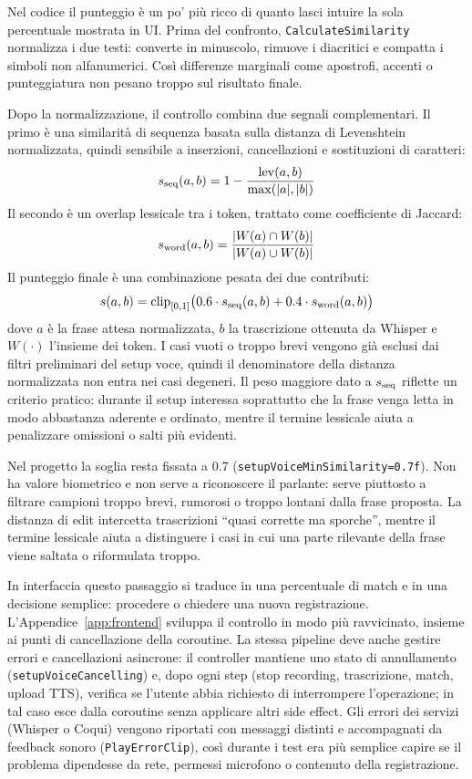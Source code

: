 Nel codice il punteggio è un po' più ricco di quanto lasci intuire la sola percentuale mostrata in UI. Prima del confronto, \texttt{CalculateSimilarity} normalizza i due testi: converte in minuscolo, rimuove i diacritici e compatta i simboli non alfanumerici. Così differenze marginali come apostrofi, accenti o punteggiatura non pesano troppo sul risultato finale.

Dopo la normalizzazione, il controllo combina due segnali complementari. Il primo è una similarità di sequenza basata sulla distanza di Levenshtein normalizzata, quindi sensibile a inserzioni, cancellazioni e sostituzioni di caratteri:
\[
s\sb{\mathrm{seq}}(a,b) = 1 - \frac{\mathrm{lev}(a,b)}{\max(|a|,|b|)}
\]
Il secondo è un overlap lessicale tra i token, trattato come coefficiente di Jaccard:
\[
s\sb{\mathrm{word}}(a,b) = \frac{|W(a)\cap W(b)|}{|W(a)\cup W(b)|}
\]
Il punteggio finale è una combinazione pesata dei due contributi:
\[
s(a,b) = \mathrm{clip}\sb{[0,1]}\big(0.6 \cdot s\sb{\mathrm{seq}}(a,b) + 0.4 \cdot s\sb{\mathrm{word}}(a,b)\big)
\]
dove \(a\) è la frase attesa normalizzata, \(b\) la trascrizione ottenuta da Whisper e \(W(\cdot)\) l'insieme dei token. I casi vuoti o troppo brevi vengono già esclusi dai filtri preliminari del setup voce, quindi il denominatore della distanza normalizzata non entra nei casi degeneri. Il peso maggiore dato a \(s\sb{\mathrm{seq}}\) riflette un criterio pratico: durante il setup interessa soprattutto che la frase venga letta in modo abbastanza aderente e ordinato, mentre il termine lessicale aiuta a penalizzare omissioni o salti più evidenti.\cite{Wang2020TextSim}

Nel progetto la soglia resta fissata a 0.7 (\texttt{setupVoiceMinSimilarity=0.7f}). Non ha valore biometrico e non serve a riconoscere il parlante: serve piuttosto a filtrare campioni troppo brevi, rumorosi o troppo lontani dalla frase proposta. La distanza di edit intercetta trascrizioni ``quasi corrette ma sporche'', mentre il termine lessicale aiuta a distinguere i casi in cui una parte rilevante della frase viene saltata o riformulata troppo.

In interfaccia questo passaggio si traduce in una percentuale di match e in una decisione semplice: procedere o chiedere una nuova registrazione. L'Appendice~\ref{app:frontend} sviluppa il controllo in modo più ravvicinato, insieme ai punti di cancellazione della coroutine. La stessa pipeline deve anche gestire errori e cancellazioni asincrone: il controller mantiene uno stato di annullamento (\texttt{setupVoiceCancelling}) e, dopo ogni step (stop recording, trascrizione, match, upload TTS), verifica se l'utente abbia richiesto di interrompere l'operazione; in tal caso esce dalla coroutine senza applicare altri side effect. Gli errori dei servizi (Whisper o Coqui) vengono riportati con messaggi distinti e accompagnati da feedback sonoro (\texttt{PlayErrorClip}), così durante i test era più semplice capire se il problema dipendesse da rete, permessi microfono o contenuto della registrazione.

